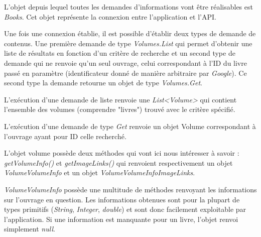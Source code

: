 L'objet depuis lequel toutes les demandes d'informations vont être réalisables est \emph{Books}. Cet objet représente la connexion entre l'application et l'API.

Une fois une connexion établie, il est possible d'établir deux types de demande de contenus.
Une première demande de type \emph{Volumes.List} qui permet d'obtenir une liste de résultats en fonction d'un critère de recherche et un second type de demande qui 
ne renvoie qu'un seul ouvrage, celui correspondant à l'ID du livre passé en paramètre (identificateur donné de manière arbitraire par \emph{Google}). Ce second type la demande retourne un objet de type \emph{Volumes.Get}.

L'exécution d'une demande de liste renvoie une \emph{List\textless Volume\textgreater} qui contient l'ensemble des volumes (comprendre "livres") trouvé avec le critère spécifié.

L'exécution d'une demande de type \emph{Get} renvoie un objet Volume correspondant à l'ouvrage ayant pour ID celle recherché.

L'objet volume possède deux méthodes qui vont ici nous intéresser à savoir : 
\emph{getVolumeInfo()} et \emph{getImageLinks()} qui renvoient respectivement un objet \emph{VolumeVolumeInfo} et un objet \emph{VolumeVolumeInfoImageLinks}.

\emph{VolumeVolumeInfo} possède une multitude de méthodes renvoyant les informations sur l'ouvrage en question.
Les informations obtenues sont pour la plupart de types primitifs (\emph{String}, \emph{Integer}, \emph{double}) et sont donc facilement exploitable par l'application.
Si une information est manquante pour un livre, l'objet renvoi simplement \emph{null}.

\newpage{}

